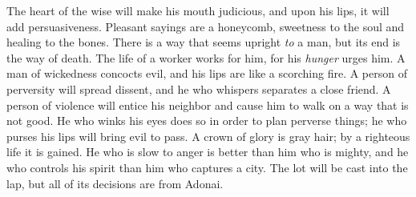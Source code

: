 \begin{biblechapter}
\verse The heart of the wise will make his mouth judicious, 
and upon his lips, it will add persuasiveness.
\verse Pleasant sayings are a honeycomb, 
sweetness to the soul and healing to the bones.
\verse There is a way that seems upright \textit{to} a man, 
but its end is the way of death.
\verse The life of a worker works for him, 
for his \textit{hunger} urges him.
\verse A man of wickedness concocts evil, 
and his lips are like a scorching fire.
\verse A person of perversity will spread dissent, 
and he who whispers separates a close friend.
\verse A person of violence will entice his neighbor 
and cause him to walk on a way that is not good.
\verse He who winks his eyes does so in order to plan perverse things; 
he who purses his lips will bring evil to pass.
\verse A crown of glory is gray hair; 
by a righteous life it is gained.
\verse He who is slow to anger is better than him who is mighty, 
and he who controls his spirit than him who captures a city.
\verse The lot will be cast into the lap, 
but all of its decisions are from Adonai.
\end{biblechapter}

